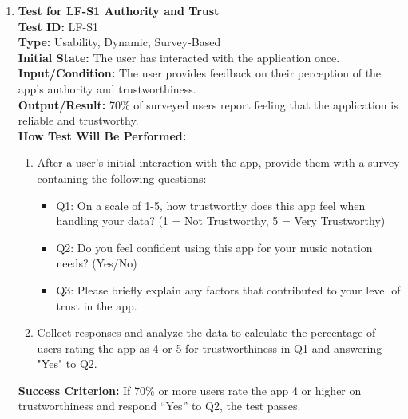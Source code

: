 \documentclass[12pt, titlepage]{article}
\begin{document}
\begin{enumerate}
    \item \textbf{Test for LF-S1 Authority and Trust} \\
      \newline
      \textbf{Test ID:} LF-S1 \\
      \textbf{Type:} Usability, Dynamic, Survey-Based \\
      \textbf{Initial State:} The user has interacted with the application once. \\
      \textbf{Input/Condition:} The user provides feedback on their perception of the app’s authority and trustworthiness. \\
      \textbf{Output/Result:} 70\% of surveyed users report feeling that the application is reliable and trustworthy. \\
      \textbf{How Test Will Be Performed:}
      \begin{enumerate}
          \item After a user’s initial interaction with the app, provide them with a survey containing the following questions:
          \begin{itemize}
              \item Q1: On a scale of 1-5, how trustworthy does this app feel when handling your data? (1 = Not Trustworthy, 5 = 
              Very Trustworthy)
              \item Q2: Do you feel confident using this app for your music notation needs? (Yes/No)
              \item Q3: Please briefly explain any factors that contributed to your level of trust in the app.
          \end{itemize}
          \item Collect responses and analyze the data to calculate the percentage of users rating the app as 4 or 5 for 
          trustworthiness in Q1 and answering "Yes" to Q2.
      \end{enumerate}
      \textbf{Success Criterion:} If 70\% or more users rate the app 4 or higher on trustworthiness and respond “Yes” to Q2, the 
      test passes.
\end{enumerate}
\end{document}
